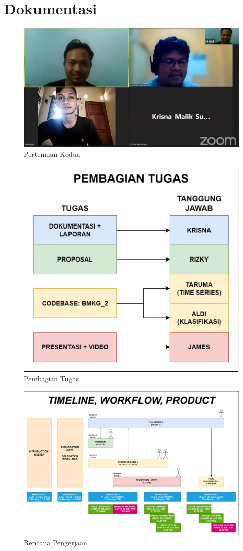 \documentclass[12pt, a4paper]{article}
\begin{document}
\bigskip
\section*{Dokumentasi}
\begin{figure}[h]
    \centering
    \includegraphics[width=\textwidth]{pert-2}
    \caption{Pertemuan Kedua}
\end{figure}

\begin{figure}[h]
    \centering
    \includegraphics[width=\textwidth]{pert-21}
    \caption{Pembagian Tugas}
    \label{fig:pert-21}
\end{figure}

\begin{figure}[h]
    \centering
    \includegraphics[width=\textwidth]{pert-22}
    \caption{Rencana Pengerjaan}
    \label{fig:pert-22}
\end{figure}
\end{document}
